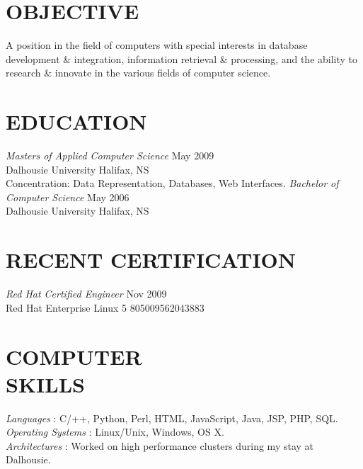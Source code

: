 \documentclass[line,margin]{res}
\begin{document}
\address{3139 Veith Street, Halifax, NS B3K 3G9}
\address{(902) 489-2557 or (902) 444-4974}


\begin{resume}

\section{OBJECTIVE}
    A position in the field of computers with special
    interests in database development {\&} integration,
    information retrieval {\&} processing, and the ability to
    research {\&} innovate in the various fields of computer
    science.


\section{EDUCATION}
    {\sl Masters of Applied Computer Science} \hfill May 2009\\
        Dalhousie University \hfill Halifax, NS\\
        Concentration: Data Representation, Databases,
        Web Interfaces.  \medskip
    \newline
    {\sl Bachelor of Computer Science} \hfill May 2006\\
        Dalhousie University \hfill Halifax, NS

\section{RECENT CERTIFICATION}
    {\sl Red Hat Certified Engineer} \hfill Nov 2009\\
        Red Hat Enterprise Linux 5 \hfill 805009562043883\\

\section{COMPUTER \\ SKILLS}
    {\sl Languages \hspace{35pt}}:
     C/++, Python, Perl, HTML, JavaScript, Java, JSP, PHP, SQL.\\
    {\sl Operating Systems }:
     Linux/Unix, Windows, OS X. \\
    {\sl Architectures \hspace{27pt}}:
     Worked on high performance clusters during my stay at \\
     \hspace*{92pt} Dalhousie.


\end{resume}
\end{document}
